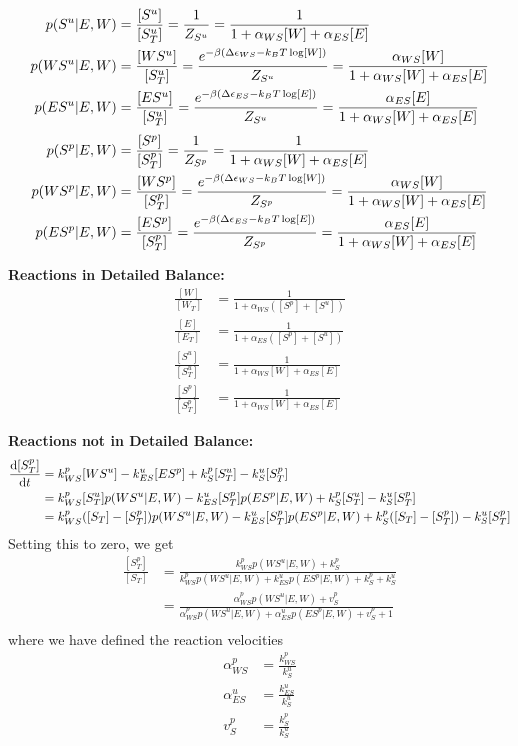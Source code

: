 \documentclass[aps,onecolumn,superscriptaddress,notitlepage]{revtex4-1}
\begin{document}
\begin{align}
p(S^u|E, W) &= \frac{[S^u]}{[S^u_T]} = \frac{1}{Z_{S^u}} = \frac{1}{1 + \alpha_{WS}[W]+ \alpha_{ES}[E]}\\
p(WS^u|E, W) &= \frac{[WS^u]}{[S^u_T]} = \frac{ e^{-\beta\qty(\Delta\epsilon_{WS} -k_BT \log[W])}}{Z_{S^u}} = \frac{\alpha_{WS}[W]}{1 + \alpha_{WS}[W]+ \alpha_{ES}[E]}\\
p(ES^u|E, W) &= \frac{[ES^u]}{[S^u_T]} = \frac{ e^{-\beta\qty(\Delta\epsilon_{ES} -k_BT \log[E])}}{Z_{S^u}} = \frac{\alpha_{ES}[E]}{1 + \alpha_{WS}[W]+ \alpha_{ES}[E]}
\end{align}
\begin{align}
p(S^p|E, W) &= \frac{[S^p]}{[S^p_T]} = \frac{1}{Z_{S^p}} = \frac{1}{1 + \alpha_{WS}[W]+ \alpha_{ES}[E]}\\
p(WS^p|E, W) &= \frac{[WS^p]}{[S^p_T]} = \frac{ e^{-\beta\qty(\Delta\epsilon_{WS} -k_BT \log[W])}}{Z_{S^p}} = \frac{\alpha_{WS}[W]}{1 + \alpha_{WS}[W]+ \alpha_{ES}[E]}\\
p(ES^p|E, W) &= \frac{[ES^p]}{[S^p_T]} = \frac{ e^{-\beta\qty(\Delta\epsilon_{ES} -k_BT \log[E])}}{Z_{S^p}} = \frac{\alpha_{ES}[E]}{1 + \alpha_{WS}[W]+ \alpha_{ES}[E]}
\end{align}

\textbf{Reactions in Detailed Balance:}
\begin{align}
\frac{[W]}{[W_T]} & = \frac{1}{1 + \alpha_{WS}([S^p]+[S^u])}\\
\frac{[E]}{[E_T]} & = \frac{1}{1 + \alpha_{ES}([S^p]+[S^u])}\\
\frac{[S^u]}{[S^u_T]} &= \frac{1}{1 + \alpha_{WS}[W]+ \alpha_{ES}[E]}\\
\frac{[S^p]}{[S^p_T]} &=  \frac{1}{1+ \alpha_{WS}[W] + \alpha_{ES}[E]}
\end{align}

\textbf{Reactions not in  Detailed Balance:}
\begin{align}
\dv{[S^p_T]}{t} &= k_{WS}^p[WS^u] - k_{ES}^u[ES^p] + k_S^p[S^u_T] - k_S^u[S^p_T] \\
&= k_{WS}^p[S^u_T]p(WS^u|E, W) - k_{ES}^u[S^p_T]p(ES^p|E, W) + k_S^p[S^u_T] - k_S^u[S^p_T]\\
&= k_{WS}^p([S_T]-[S^p_T])p(WS^u|E, W) - k_{ES}^u[S^p_T]p(ES^p|E, W) + k_S^p([S_T]-[S^p_T]) - k_S^u[S^p_T]
\end{align}
Setting this to zero, we get
\begin{align}
\frac{[S_T^p]}{[S_T]} &= \frac{k_{WS}^p p(WS^u|E,W) + k_S^p}{k_{WS}^p p(WS^u|E,W) + k_{ES}^u p(ES^p|E,W) + k_S^p + k_S^u}\\
 &= \frac{\alpha_{WS}^p p(WS^u|E,W) + v_S^p}{\alpha_{WS}^p p(WS^u|E,W) + \alpha_{ES}^u p(ES^p|E,W) + v_S^p + 1}\\
\end{align}
where we have defined the reaction velocities
\begin{align}
\alpha_{WS}^p &= \frac{k_{WS}^p}{k_S^u}\\
\alpha_{ES}^u &= \frac{k_{ES}^u}{k_S^u}\\
v_S^p &= \frac{k_S^p}{k_S^u}
\end{align}
\end{document}
